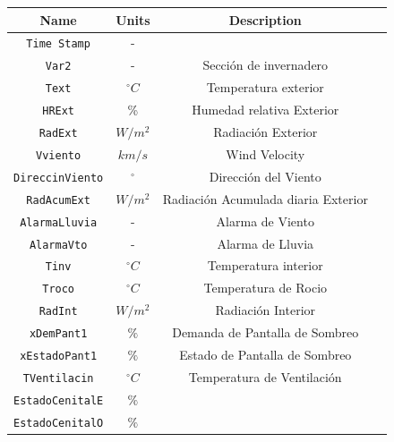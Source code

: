 \begin{table}
    \centering
    \begin{tabular}{|c|c|c|c|}
        \hline
        \textbf{Name}           & \textbf{Units} & \textbf{Description}         \\ 
        \hline
        \texttt{Time Stamp}         & -              &                              \\ \hline
        \texttt{Var2}               & -              & Sección de invernadero       \\ \hline
        \texttt{Text}               & $^\circ C$     & Temperatura exterior         \\ \hline
        \texttt{HRExt}              & \%             & Humedad relativa Exterior    \\ \hline
        \texttt{RadExt}             & $W/m^2$        & Radiación Exterior           \\ \hline
        \texttt{Vviento}            & $km/s$         & Wind Velocity         \\  \hline
        \texttt{DireccinViento}     & $^\circ$       & Dirección del Viento         \\ \hline
        \texttt{RadAcumExt}         & $W/m^2$        & Radiación Acumulada diaria Exterior \\ \hline
        \texttt{AlarmaLluvia}       & -              & Alarma de Viento             \\ \hline
        \texttt{AlarmaVto}          & -              & Alarma de Lluvia             \\ \hline
        \texttt{Tinv}               & $^\circ C$     & Temperatura interior         \\ \hline
        \texttt{Troco}              & $^\circ C$     & Temperatura de Rocio\\  \hline
        \texttt{RadInt}             & $W/m^2$        & Radiación Interior \\ \hline
        \texttt{xDemPant1}          & $\%$           & Demanda de Pantalla de Sombreo\\ \hline
        \texttt{xEstadoPant1}       & $\%$           & Estado de Pantalla de Sombreo\\ \hline
        \texttt{TVentilacin}        & $^\circ C$     & Temperatura de Ventilación \\ \hline
        \texttt{EstadoCenitalE}     & $\%$           &       \\ \hline
        \texttt{EstadoCenitalO}     & $\%$           & \\ \hline

\end{tabular}
\end{table}
